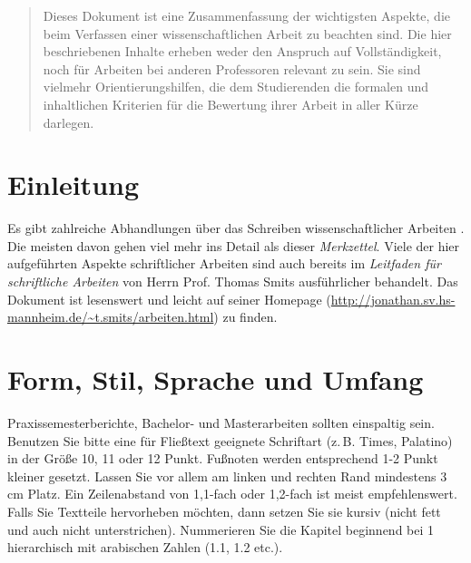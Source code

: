 \documentclass[conference,final,a4paper]{IEEEtran}
\begin{document}




\maketitle

\begin{abstract}
Dieses Dokument ist eine Zusammenfassung der wichtigsten Aspekte, die beim Verfassen einer wissenschaftlichen Arbeit zu beachten sind. Die hier beschriebenen Inhalte erheben weder den Anspruch auf Vollständigkeit, noch für Arbeiten bei anderen Professoren relevant zu sein. Sie sind vielmehr Orientierungshilfen, die dem Studierenden die formalen und inhaltlichen Kriterien für die Bewertung ihrer Arbeit in aller Kürze darlegen. 
\end{abstract}





%
\IEEEpeerreviewmaketitle



\section{Einleitung}

Es gibt zahlreiche Abhandlungen über das Schreiben wissenschaftlicher Arbeiten \cite{kraemer, kornmeier, stengel, kara, eco}. Die meisten davon gehen viel mehr ins Detail als dieser \emph{Merkzettel}. Viele der hier aufgeführten Aspekte schriftlicher Arbeiten sind auch bereits im \emph{Leitfaden für schriftliche Arbeiten} von Herrn Prof. Thomas Smits ausführlicher behandelt. Das Dokument ist lesenswert und leicht auf seiner Homepage (\url{http://jonathan.sv.hs-mannheim.de/~t.smits/arbeiten.html}) zu finden.

\section{Form, Stil, Sprache und Umfang}
Praxissemesterberichte, Bachelor- und Masterarbeiten sollten einspaltig sein. Benutzen Sie bitte eine für Fließtext geeignete Schriftart (z.\,B. Times, Palatino) in der Größe 10, 11 oder 12 Punkt. Fußnoten werden entsprechend 1-2 Punkt kleiner gesetzt. Lassen Sie vor allem am linken und rechten Rand mindestens 3 cm Platz. Ein Zeilenabstand von 1,1-fach oder 1,2-fach ist meist empfehlenswert. Falls Sie Textteile hervorheben möchten, dann setzen Sie sie kursiv (nicht fett und auch nicht unterstrichen). Nummerieren Sie die Kapitel beginnend bei 1 hierarchisch mit arabischen Zahlen (1.1, 1.2 etc.).
\end{document}

